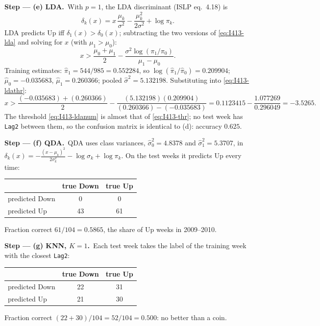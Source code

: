\documentclass[11pt,a4paper]{article}
\numberwithin{equation}{questao}   %
\newcommand{\passo}[2]{\par\smallskip\noindent\textbf{Step --- #1.}~#2}
\begin{document}
\begin{sol}
\passo{(e) LDA}{With $p=1$, the LDA discriminant (ISLP eq.~4.18) is
\begin{equation}\label{eq:I413-lda}
\delta_k(x)=x\,\frac{\mu_k}{\sigma^2}-\frac{\mu_k^2}{2\sigma^2}+\log\pi_k .
\end{equation}
LDA predicts Up iff $\delta_1(x)>\delta_0(x)$; subtracting the two versions of \eqref{eq:I413-lda} and solving for $x$ (with $\mu_1>\mu_0$):
\begin{equation}\label{eq:I413-ldathr}
x>\frac{\mu_0+\mu_1}{2}-\frac{\sigma^2\log(\pi_1/\pi_0)}{\mu_1-\mu_0} .
\end{equation}
Training estimates: $\hat\pi_1=544/985=0.552284$, so $\log(\hat\pi_1/\hat\pi_0)=0.209904$;
$\hat\mu_0=-0.035683$, $\hat\mu_1=0.260366$; pooled $\hat\sigma^2=5.132198$. Substituting into \eqref{eq:I413-ldathr}:
\begin{equation}\label{eq:I413-ldanum}
x>\frac{(-0.035683)+(0.260366)}{2}-\frac{(5.132198)(0.209904)}{(0.260366)-(-0.035683)}
=0.1123415-\frac{1.077269}{0.296049}=-3.5265 .
\end{equation}
The threshold \eqref{eq:I413-ldanum} is almost that of \eqref{eq:I413-thr}; no test week has
\texttt{Lag2} between them, so the confusion matrix is identical to (d): accuracy $0.625$.}

\passo{(f) QDA}{QDA uses class variances, $\hat\sigma_0^2=4.8378$ and $\hat\sigma_1^2=5.3707$, in
$\delta_k(x)=-\tfrac{(x-\mu_k)^2}{2\sigma_k^2}-\log\sigma_k+\log\pi_k$. On the test weeks it predicts Up every time:
\begin{center}\begin{tabular}{lcc}\toprule
 & true Down & true Up\\\midrule
predicted Down & 0 & 0\\
predicted Up & 43 & 61\\\bottomrule\end{tabular}\end{center}
Fraction correct $61/104=0.5865$, the share of Up weeks in 2009--2010.}

\passo{(g) KNN, $K=1$}{Each test week takes the label of the training week with the closest
\texttt{Lag2}:
\begin{center}\begin{tabular}{lcc}\toprule
 & true Down & true Up\\\midrule
predicted Down & 22 & 31\\
predicted Up & 21 & 30\\\bottomrule\end{tabular}\end{center}
Fraction correct $(22+30)/104=52/104=0.500$: no better than a coin.}


\end{sol}
\end{document}

